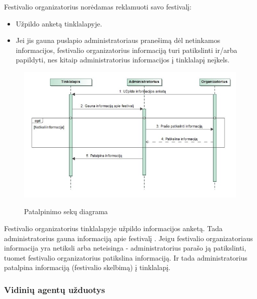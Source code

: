 \documentclass{VUMIFPSkursinis}
\begin{document}
Festivalio organizatorius norėdamas reklamuoti savo festivalį:
\begin{itemize}
\item Užpildo anketą tinklalapyje.
\item Jei jis gauna puslapio administratoriaus pranešimą dėl netinkamos informacijos, festivalio organizatorius informaciją turi patikslinti ir/arba papildyti, nes kitaip administratorius informacijos į tinklalapį neįkels.
\end{itemize}

\begin{figure}[H]
    \centering
    \includegraphics[scale=0.7]{img/geri/_Organizatorius}
    \label{img:uml12}
	\caption{Patalpinimo sekų diagrama}
\end{figure}

Festivalio organizatorius tinklalapyje užpildo informacijos anketą. Tada administratorius gauna informaciją apie festivalį . Jeigu festivalio organizatoriaus informacija yra netiksli arba neteisinga - administratorius parašo ją patikslinti, tuomet festivalio organizatorius patikslina informaciją. Ir tada administratorius patalpina informaciją (festivalio skelbimą) į tinklalapį.

\subsubsection{Vidinių agentų užduotys} 
\end{document}
